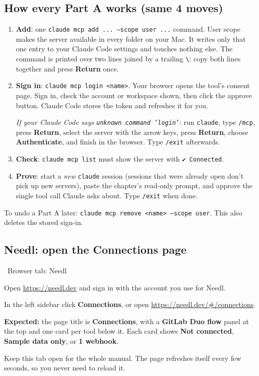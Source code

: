 \documentclass[11pt,a4paper]{article}
\newcommand{\ui}[1]{\textbf{#1}}
\newcommand{\where}[1]{\par\smallskip\noindent\colorbox{winbg}{\color{winfg}\bfseries\strut\ #1\ }\par\nopagebreak[4]}
\newcommand{\lit}[1]{\texttt{#1}}
\begin{document}
\subsection{How every Part A works (same 4 moves)}
\begin{enumerate}[label=\textbf{\arabic*.},leftmargin=*]
\item \textbf{Add}: one \lit{claude mcp add ... --scope user ...} command. User scope makes the server available in every folder on your Mac. It writes only that one entry to your Claude Code settings and touches nothing else. The command is printed over two lines joined by a trailing \lit{\textbackslash}: copy both lines together and press \ui{Return} once.
\item \textbf{Sign in}: \lit{claude mcp login <name>}. Your browser opens the tool's consent page. Sign in, check the account or workspace shown, then click the approve button. Claude Code stores the token and refreshes it for you.

\emph{If your Claude Code says \lit{unknown command 'login'}}: run \lit{claude}, type \lit{/mcp}, press \ui{Return}, select the server with the arrow keys, press \ui{Return}, choose \ui{Authenticate}, and finish in the browser. Type \lit{/exit} afterwards.
\item \textbf{Check}: \lit{claude mcp list} must show the server with \lit{✔ Connected}.
\item \textbf{Prove}: start a \emph{new} \lit{claude} session (sessions that were already open don't pick up new servers), paste the chapter's read-only prompt, and approve the single tool call Claude asks about. Type \lit{/exit} when done.
\end{enumerate}
To undo a Part A later: \lit{claude mcp remove <name> --scope user}. This also deletes the stored sign-in.

\subsection{Needl: open the Connections page}
\where{Browser tab: Needl}
\begin{steps}
\item Open \url{https://needl.dev} and sign in with the account you use for Needl.
\item In the left sidebar click \ui{Connections}, or open \url{https://needl.dev/#/connections}.
\item \textbf{Expected:} the page title is \ui{Connections}, with a \ui{GitLab Duo flow} panel at the top and one card per tool below it. Each card shows \ui{Not connected}, \ui{Sample data only}, or \ui{1 webhook}.
\end{steps}
Keep this tab open for the whole manual. The page refreshes itself every few seconds, so you never need to reload it.
\end{document}
